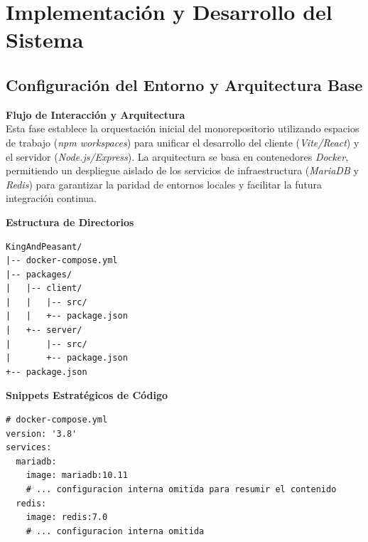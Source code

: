 \chapter{Implementación y Desarrollo del Sistema}

\begin{abstract}
Este capítulo documenta el ciclo de vida del desarrollo de software del proyecto \textit{King and Peasant}, narrando la evolución técnica desde la orquestación inicial de la infraestructura hasta la estabilización funcional del motor asimétrico. El objetivo principal es exponer las decisiones arquitectónicas, algorítmicas y de diseño adoptadas a lo largo de 16 iteraciones iterativas e incrementales. Se detalla la resolución de retos complejos de ingeniería, como la sincronización bidireccional mediante WebSockets, la protección de estados asimétricos a través de DTOs, la gestión de memoria en lógicas de cascada y la automatización del aseguramiento de la calidad. A través de este análisis progresivo, se justifica de forma práctica cómo los requerimientos de fiabilidad, rendimiento y mantenibilidad han sido satisfechos en el producto final.
\end{abstract}

\section{Configuración del Entorno y Arquitectura Base}

\textbf{Flujo de Interacción y Arquitectura} \\
Esta fase establece la orquestación inicial del monorepositorio utilizando espacios de trabajo (\textit{npm workspaces}) para unificar el desarrollo del cliente (\textit{Vite/React}) y el servidor (\textit{Node.js/Express}). La arquitectura se basa en contenedores \textit{Docker}, permitiendo un despliegue aislado de los servicios de infraestructura (\textit{MariaDB} y \textit{Redis}) para garantizar la paridad de entornos locales y facilitar la futura integración continua.

\textbf{Estructura de Directorios} \\
\begin{verbatim}
KingAndPeasant/
|-- docker-compose.yml
|-- packages/
|   |-- client/
|   |   |-- src/
|   |   +-- package.json
|   +-- server/
|       |-- src/
|       +-- package.json
+-- package.json
\end{verbatim}

\textbf{Snippets Estratégicos de Código} \\
\begin{lstlisting}[breaklines=true]
# docker-compose.yml
version: '3.8'
services:
  mariadb:
    image: mariadb:10.11
    # ... configuracion interna omitida para resumir el contenido
  redis:
    image: redis:7.0
    # ... configuracion interna omitida
\end{lstlisting}

